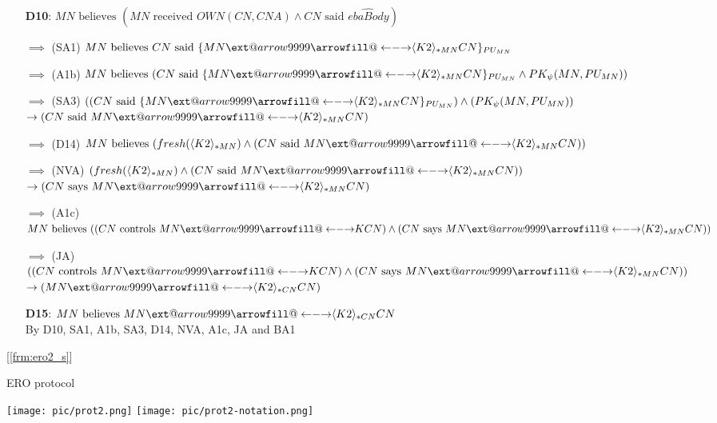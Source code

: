 \documentclass[10pt]{beamer}
\makeatletter
\newcommand\xleftrightarrow[2][]{%
  \ext@arrow 9999{\longleftrightarrowfill@}{#1}{#2}}
\newcommand\longleftrightarrowfill@{%
  \arrowfill@\leftarrow\relbar\rightarrow}
\newcommand{\xtext}[1]{\text{ #1 }}
\makeatother
\begin{document}
\begin{frame}
	\label{frm:ero2_f}
	\small
	\begin{itemize}
		\item [] \textbf{D10}: $MN \xtext{believes} (MN \xtext{received} OWN(CN,CNA) \land CN \xtext{said} \widehat{ebaBody})$
		\item [$\implies$] (SA1) $MN \xtext{believes} CN \xtext{said} \{MN \xleftrightarrow{\langle K2\rangle_{*MN}}CN\}_{PU_{MN}}$
		\item [$\implies$] (A1b) $MN \xtext{believes} (CN \xtext{said} \{MN \xleftrightarrow{\langle K2\rangle_{*MN}}CN\}_{PU_{MN}} \land PK_\psi(MN, PU_{MN}))$
		\item [$\implies$] (SA3) $((CN \xtext{said} \{MN \xleftrightarrow{\langle K2\rangle_{*MN}}CN\}_{PU_{MN}}) \land (PK_\psi(MN, PU_{MN}))$ \\$ \rightarrow (CN \xtext{said} MN \xleftrightarrow{\langle K2\rangle_{*MN}}CN)$
		\item [$\implies$] (D14) $MN \xtext{believes} (fresh(\langle K2\rangle_{*MN}) \land (CN \xtext{said} MN \xleftrightarrow{\langle K2\rangle_{*MN}}CN))$
		\item [$\implies$] (NVA) $(fresh(\langle K2\rangle_{*MN}) \land (CN \xtext{said} MN \xleftrightarrow{\langle K2\rangle_{*MN}}CN)) $ \\ $\rightarrow (CN \xtext{says} MN \xleftrightarrow{\langle K2\rangle_{*MN}}CN)$
		\item [$\implies$] (A1c) $MN \xtext{believes} ((CN \xtext{controls} MN\xleftrightarrow{K}CN) \land (CN \xtext{says} MN \xleftrightarrow{\langle K2\rangle_{*MN}}CN))$
		\item [$\implies$] (JA) $((CN \xtext{controls} MN\xleftrightarrow{K}CN) \land (CN \xtext{says} MN \xleftrightarrow{\langle K2\rangle_{*MN}}CN))$ \\$\rightarrow (MN \xleftrightarrow{\langle K2\rangle_{*CN}} CN)$
		\item [] \textbf{D15}: {\small $MN \xtext{believes} MN \xleftrightarrow{\langle K2\rangle_{*CN}} CN$ \\ \hspace{1.7cm} By D10, SA1, A1b, SA3, D14, NVA, A1c, JA and BA1}
	\end{itemize}
	[\underline{\ref{frm:ero2_s}}]
\end{frame}
\begin{frame}{ERO protocol}
	
	\begin{center} 
		\texttt{[image: pic/prot2.png]}
		\vspace*{30.0cm}
		\texttt{[image: pic/prot2-notation.png]}
	\end{center}
\end{frame}
\end{document}
